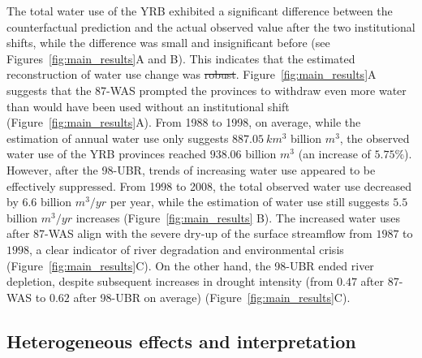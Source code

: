 \documentclass[preprint, 12pt]{elsarticle}
\providecommand{\DIFaddtex}[1]{{\protect\color{blue}\uwave{#1}}} %
\providecommand{\DIFdeltex}[1]{{\protect\color{red}\sout{#1}}}                      %
\providecommand{\DIFaddbegin}{} %
\providecommand{\DIFaddend}{} %
\providecommand{\DIFdelbegin}{} %
\providecommand{\DIFdelend}{} %
\providecommand{\DIFadd}[1]{\texorpdfstring{\DIFaddtex{#1}}{#1}} %
\providecommand{\DIFdel}[1]{\texorpdfstring{\DIFdeltex{#1}}{}} %
\begin{document}
The total water use of the YRB exhibited a significant difference between the counterfactual prediction and the actual observed value after the two institutional shifts, while the difference was small and insignificant before (see Figures~\ref{fig:main_results}A and B). This indicates that the estimated reconstruction of water use change was \DIFdelbegin \DIFdel{robust}\DIFdelend \DIFaddbegin \DIFadd{effective}\DIFaddend .
Figure~\ref{fig:main_results}A suggests that the 87-WAS prompted the provinces to withdraw even more water than would have been used without an institutional shift (Figure~\ref{fig:main_results}A).
From 1988 to 1998, on average, while the estimation of annual water use only suggests \DIFdelbegin \DIFdel{$887.05~km^3$ }\DIFdelend \DIFaddbegin \DIFadd{$887.05$ }\DIFaddend billion $m^3$, the observed water use of the YRB provinces reached $938.06$ billion $m^3$ (an increase of $5.75\%$).
However, after the 98-UBR, trends of increasing water use appeared to be effectively suppressed.
From 1998 to 2008, the total observed water use decreased by $6.6$ billion $m^3/yr$ per year, while the estimation of water use still suggests $5.5$ billion $m^3/yr$ increases (Figure~\ref{fig:main_results} B).
The increased water uses after 87-WAS align with the severe dry-up of the surface streamflow from $1987$ to $1998$, a clear indicator of river degradation and environmental crisis (Figure~\ref{fig:main_results}C).
On the other hand, the 98-UBR ended river depletion, despite subsequent increases in drought intensity (from $0.47$ after 87-WAS to $0.62$ after 98-UBR on average) (Figure~\ref{fig:main_results}C).

\subsection{Heterogeneous effects and interpretation}\label{result-3}
\end{document}
